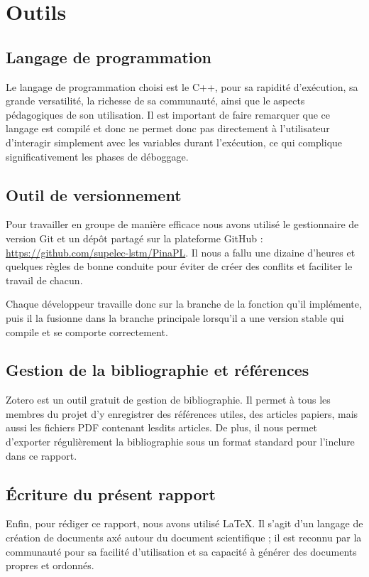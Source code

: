 \section{Outils}

\subsection{Langage de programmation}
Le langage de programmation choisi est le C++, pour sa rapidité d'exécution,
sa grande versatilité, la richesse de sa communauté, ainsi que le aspects pédagogiques de son
utilisation. Il est important de faire remarquer que ce langage est compilé et
donc ne permet donc pas directement à l'utilisateur d'interagir simplement avec les
variables durant l'exécution, ce qui complique significativement les phases de déboggage.

\subsection{Outil de versionnement}

Pour travailler en groupe de manière efficace nous avons utilisé le
gestionnaire de version Git et un dépôt partagé sur la plateforme GitHub :
\url{https://github.com/supelec-lstm/PinaPL}. Il nous a fallu une dizaine
d'heures et quelques règles de bonne conduite pour éviter de créer des
conflits et faciliter le travail de chacun.

\smallskip

Chaque développeur travaille donc sur la branche de la fonction qu'il
implémente, puis il la fusionne dans la branche principale lorsqu'il a une version
stable qui compile et se comporte correctement.

\subsection{Gestion de la bibliographie et références}

Zotero est un outil gratuit de gestion de bibliographie. Il permet à tous les
membres du projet d'y enregistrer des références utiles, des articles papiers,
mais aussi les fichiers PDF contenant lesdits articles.
De plus, il nous permet d'exporter régulièrement la bibliographie sous un
format standard pour l'inclure dans ce rapport.

\subsection{Écriture du présent rapport}

Enfin, pour rédiger ce rapport, nous avons utilisé \LaTeX\xspace. Il s'agit d'un
langage de création de documents axé autour du document
scientifique ; il est reconnu par la communauté pour sa facilité d'utilisation
et sa capacité à générer des documents propres et ordonnés.
